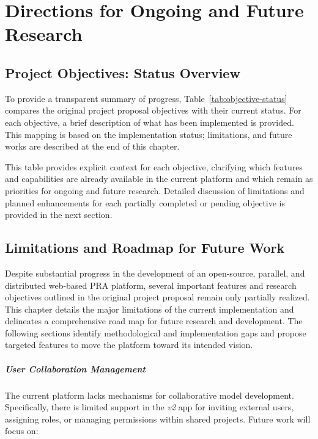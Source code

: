\chapter{Directions for Ongoing and Future Research}

\section{Project Objectives: Status Overview}

To provide a transparent summary of progress, Table~\ref{tab:objective-status} compares the original project proposal objectives with their current status. For each objective, a brief description of what has been implemented is provided. This mapping is based on the implementation status; limitations, and future works are described at the end of this chapter.



\noindent
This table provides explicit context for each objective, clarifying which features and capabilities are already available in the current platform and which remain as priorities for ongoing and future research. Detailed discussion of limitations and planned enhancements for each partially completed or pending objective is provided in the next section.

\section{Limitations and Roadmap for Future Work}

Despite substantial progress in the development of an open-source, parallel, and distributed web-based PRA platform, several important features and research objectives outlined in the original project proposal remain only partially realized. This chapter details the major limitations of the current implementation and delineates a comprehensive road map for future research and development. The following sections identify methodological and implementation gaps and propose targeted features to move the platform toward its intended vision.

\paragraph{User Collaboration Management}

The current platform lacks mechanisms for collaborative model development. Specifically, there is limited support in the \textit{v2} app for inviting external users, assigning roles, or managing permissions within shared projects. Future work will focus on:

